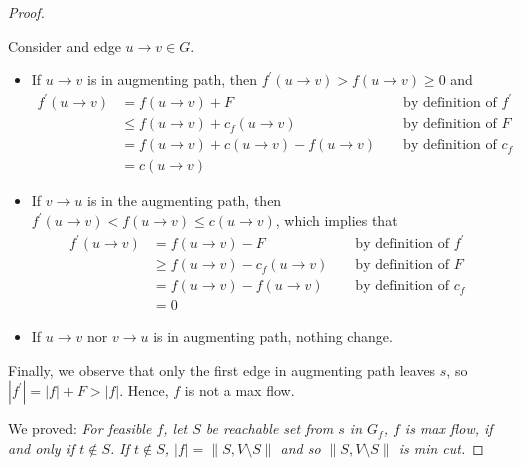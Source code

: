 \begin{proof}
\begin{enumerate}[label={Case \arabic*}, leftmargin=1in]
        Consider and edge $u \rightarrow v \in G$.
        \begin{itemize}
            \item If $u \rightarrow v$ is in augmenting path,
                then $f^\prime(u \rightarrow v) > f(u \rightarrow v) \geq 0$ and
                \begin{align*}
                    f^\prime(u \rightarrow v) &= f(u \rightarrow v) + F && \text{ by definition of $f^\prime$ } \\
                                              &\leq f(u \rightarrow v) + c_f(u \rightarrow v) && \text{ by definition of $F$ } \\
                                              &= f(u \rightarrow v) + c(u \rightarrow v) - f(u \rightarrow v) && \text{ by definition of $c_f$ } \\
                                              &= c(u \rightarrow v)
                \end{align*}
            \item If $v \rightarrow u$ is in the augmenting path,
                then $f^\prime(u \rightarrow v) < f(u \rightarrow v) \leq c(u \rightarrow v)$,
                which implies that
                \begin{align*}
                    f^\prime(u \rightarrow v) &= f(u \rightarrow v) - F && \text{ by definition of $f^\prime$ } \\
                                              &\geq f(u \rightarrow v) - c_f(u \rightarrow v) && \text{ by definition of $F$ } \\
                                              &= f(u \rightarrow v) - f(u \rightarrow v) && \text{ by definition of $c_f$ } \\
                                              &= 0
                \end{align*}
            \item If $u \rightarrow v$ nor $v \rightarrow u$ is in augmenting path, nothing change.
        \end{itemize}
\end{enumerate}
Finally, we observe that only the first edge in augmenting path leaves $s$,
so $|f^\prime| = |f| + F > |f|$. Hence, $f$ is not a max flow.

We proved:
\emph{For feasible $f$, let $S$ be reachable set from $s$ in $G_f$, $f$ is max flow,
if and only if $t \notin S$.
If $t \notin S$, $|f| = \|S, V \setminus S\|$ and so $\|S, V \setminus S\|$ is min cut.}
\end{proof}

